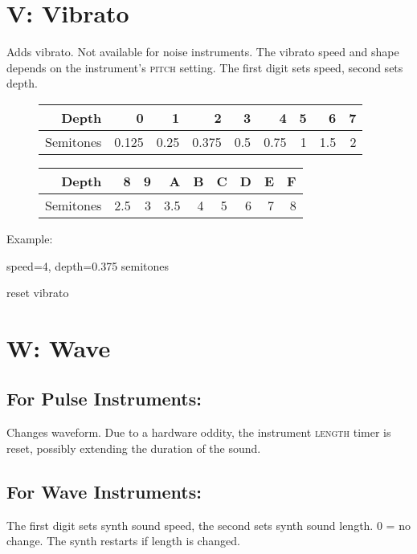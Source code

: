 \section{V: Vibrato}

Adds vibrato. Not available for noise instruments. The vibrato speed and shape depends on the instrument's \textsc{pitch} setting.
The first digit sets speed, second sets depth.

\begin{figure}[hbtp]
    \begin{tabular}{r|r|r|r|r|r|r|r|r}
        Depth & 0 & 1 & 2 & 3 & 4 & 5 & 6 & 7 \\
        \hline
        Semitones & 0.125 & 0.25 & 0.375 & 0.5 & 0.75 & 1 & 1.5 & 2 \\
    \end{tabular}

    \begin{tabular}{r|r|r|r|r|r|r|r|r}
        Depth & 8 & 9 & A & B & C & D & E & F \\
        \hline
        Semitones & 2.5 & 3 & 3.5 & 4 & 5 & 6 & 7 & 8 \\
    \end{tabular}
\end{figure}

\begin{description}
\item Example:
\item[V42] speed=4, depth=0.375 semitones
\item[V00] reset vibrato
\end{description}

\section{W: Wave}

\subsection{For Pulse Instruments:}
Changes waveform. Due to a hardware oddity, the instrument \textsc{length} timer is reset, possibly extending the duration of the sound.

\subsection{For Wave Instruments:}
The first digit sets synth sound speed, the second sets synth sound length. 0 = no change. The synth restarts if length is changed.

